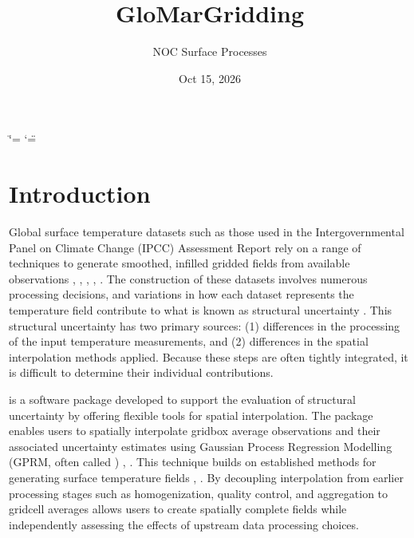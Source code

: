 \documentclass[letterpaper,10pt,english]{sphinxmanual}
\title{GloMarGridding}
\date{Oct 15, 2026}
\author{NOC Surface Processes}
\begin{document}
\ifdefined\shorthandoff
  \ifnum\catcode`\=\string=\active\shorthandoff{=}\fi
  \ifnum\catcode`\"=\active{}\fi
\fi

\pagestyle{empty}
\sphinxmaketitle
\pagestyle{plain}
\sphinxtableofcontents
\pagestyle{normal}
\label{\detokenize{index::doc}}


\sphinxstepscope


\chapter{Introduction}
\label{\detokenize{introduction:introduction}}\label{\detokenize{introduction::doc}}
\sphinxAtStartPar
Global surface temperature datasets \sphinxhyphen{} such as those used in the Intergovernmental Panel on Climate
Change (IPCC) Assessment Report  rely on a range of techniques to generate smoothed, infilled
gridded fields from available observations , , , ,
 . The construction of these datasets involves numerous processing decisions, and variations
in how each dataset represents the temperature field contribute to what is known as structural
uncertainty . This structural uncertainty has two primary sources: (1) differences in the
processing of the input temperature measurements, and (2) differences in the spatial interpolation
methods applied. Because these steps are often tightly integrated, it is difficult to determine
their individual contributions.

\sphinxAtStartPar
{} is a software package developed to support the evaluation of structural
uncertainty by offering flexible tools for spatial interpolation. The package enables users to
spatially interpolate grid\sphinxhyphen{}box average observations and their associated uncertainty estimates using
Gaussian Process Regression Modelling (GPRM, often called ) ,  . This
technique builds on established methods for generating surface temperature fields ,
. By decoupling interpolation from earlier processing stages \sphinxhyphen{} such as homogenization,
quality control, and aggregation to grid\sphinxhyphen{}cell averages \sphinxhyphen{}  allows users to create
spatially complete fields while independently assessing the effects of upstream data processing
choices.
\end{document}
